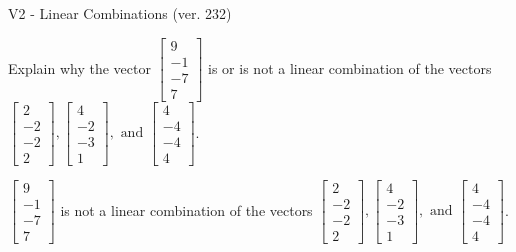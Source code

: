 \begin{exercise}
  \begin{exerciseTitle}V2 - Linear Combinations (ver. 232)\end{exerciseTitle}
  \begin{exerciseStatement}
    Explain why the vector \(\left[\begin{array}{c}
9 \\
-1 \\
-7 \\
7
\end{array}\right]\)  is or is not a linear 
	combination of the vectors \(\left[\begin{array}{c}
2 \\
-2 \\
-2 \\
2
\end{array}\right] , \left[\begin{array}{c}
4 \\
-2 \\
-3 \\
1
\end{array}\right] , \text{ and } \left[\begin{array}{c}
4 \\
-4 \\
-4 \\
4
\end{array}\right]\).
	


  \end{exerciseStatement}
  \begin{exerciseAnswer}
   \(\left[\begin{array}{c}
9 \\
-1 \\
-7 \\
7
\end{array}\right]\) 
  	 is not  
	a linear combination of the vectors \(\left[\begin{array}{c}
2 \\
-2 \\
-2 \\
2
\end{array}\right] , \left[\begin{array}{c}
4 \\
-2 \\
-3 \\
1
\end{array}\right] , \text{ and } \left[\begin{array}{c}
4 \\
-4 \\
-4 \\
4
\end{array}\right]\).

	
  


  \end{exerciseAnswer}
\end{exercise}